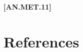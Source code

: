 \begin{refsection}
\begin{itemize}
            {\raggedleft \textbf{[AN.MET.11]}\par}
            \vspace{0.5cm}
        
    \end{itemize}
 




\newpage

\label{sec:references-animal-module}
\section{References}
\printbibliography[heading=subbibliography,title={ }]
\end{refsection}

